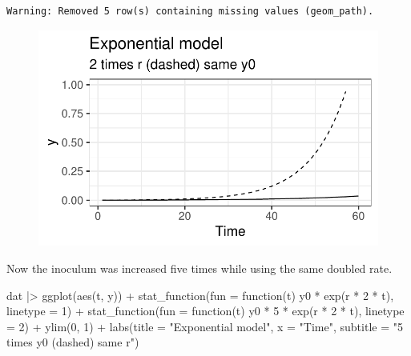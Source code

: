 \documentclass[
  letterpaper,
  DIV=11,
  numbers=noendperiod]{scrreprt}
\newenvironment{Shaded}{\begin{snugshade}}{\end{snugshade}}
\newcommand{\AttributeTok}[1]{\textcolor[rgb]{0.40,0.45,0.13}{#1}}
\newcommand{\ControlFlowTok}[1]{\textcolor[rgb]{0.00,0.23,0.31}{#1}}
\newcommand{\DecValTok}[1]{\textcolor[rgb]{0.68,0.00,0.00}{#1}}
\newcommand{\FunctionTok}[1]{\textcolor[rgb]{0.28,0.35,0.67}{#1}}
\newcommand{\NormalTok}[1]{\textcolor[rgb]{0.00,0.23,0.31}{#1}}
\newcommand{\SpecialCharTok}[1]{\textcolor[rgb]{0.37,0.37,0.37}{#1}}
\newcommand{\StringTok}[1]{\textcolor[rgb]{0.13,0.47,0.30}{#1}}
\begin{document}
\begin{verbatim}
Warning: Removed 5 row(s) containing missing values (geom_path).
\end{verbatim}

\begin{figure}[H]

{\centering \includegraphics{./temporal-models_files/figure-pdf/unnamed-chunk-6-1.pdf}

}

\end{figure}

Now the inoculum was increased five times while using the same doubled
rate.

\begin{Shaded}
\begin{Highlighting}[]
\NormalTok{dat }\SpecialCharTok{|\textgreater{}}
  \FunctionTok{ggplot}\NormalTok{(}\FunctionTok{aes}\NormalTok{(t, y)) }\SpecialCharTok{+}
  \FunctionTok{stat\_function}\NormalTok{(}\AttributeTok{fun =} \ControlFlowTok{function}\NormalTok{(t) y0 }\SpecialCharTok{*} \FunctionTok{exp}\NormalTok{(r }\SpecialCharTok{*} \DecValTok{2} \SpecialCharTok{*}\NormalTok{ t), }\AttributeTok{linetype =} \DecValTok{1}\NormalTok{) }\SpecialCharTok{+}
  \FunctionTok{stat\_function}\NormalTok{(}\AttributeTok{fun =} \ControlFlowTok{function}\NormalTok{(t) y0 }\SpecialCharTok{*} \DecValTok{5} \SpecialCharTok{*} \FunctionTok{exp}\NormalTok{(r }\SpecialCharTok{*} \DecValTok{2} \SpecialCharTok{*}\NormalTok{ t), }\AttributeTok{linetype =} \DecValTok{2}\NormalTok{) }\SpecialCharTok{+}
  \FunctionTok{ylim}\NormalTok{(}\DecValTok{0}\NormalTok{, }\DecValTok{1}\NormalTok{) }\SpecialCharTok{+}
  \FunctionTok{labs}\NormalTok{(}\AttributeTok{title =} \StringTok{"Exponential model"}\NormalTok{, }\AttributeTok{x =} \StringTok{"Time"}\NormalTok{,}
       \AttributeTok{subtitle =} \StringTok{"5 times y0 (dashed) same r"}\NormalTok{)}
\end{Highlighting}
\end{Shaded}
\end{document}
